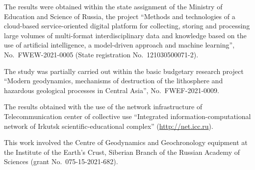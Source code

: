 \documentclass[
]{ceurart}
\begin{document}
\begin{acknowledgments}

  The results were obtained within the state assignment of the Ministry of Education and Science of Russia, the project ``Methods and technologies of a cloud-based service-oriented digital platform for collecting, storing and processing large volumes of multi-format interdisciplinary data and knowledge based on the use of artificial intelligence, a model-driven approach and machine learning'', No.~FWEW-2021-0005 (State registration No.~121030500071-2).

  The study was partially carried out within the basic budgetary research project ``Modern geodynamics, mechanisms of destruction of the lithosphere and hazardous geological processes in Central Asia'', No.~FWEF-2021-0009.

  The results obtained with the use of the network infrastructure of Telecommunication center of collective use ``Integrated information-computational network of Irkutsk scientific-educational complex'' (\url{http://net.icc.ru}).

This work involved the Centre of Geodynamics and Geochronology equipment at the Institute of the Earth's Crust, Siberian Branch of the Russian Academy of Sciences (grant No.~075-15-2021-682).

\end{acknowledgments}
% 
\end{document}
